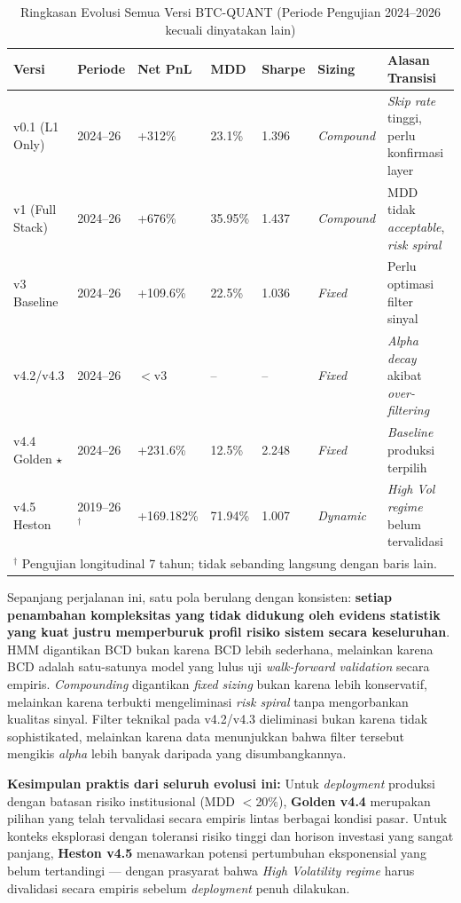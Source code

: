 \begin{table}[h!]
\centering
\caption{Ringkasan Evolusi Semua Versi BTC-QUANT (Periode Pengujian 2024--2026 kecuali dinyatakan lain)}
\label{table:evolution_all}
\begin{tabular}{@{}llllllp{3.2cm}@{}}
\toprule
\textbf{Versi} & \textbf{Periode} & \textbf{Net PnL} & \textbf{MDD} & \textbf{Sharpe} & \textbf{Sizing} & \textbf{Alasan Transisi} \\ \midrule
v0.1 (L1 Only)  & 2024--26 & +312\%   & 23.1\%  & 1.396 & \textit{Compound} & \textit{Skip rate} tinggi, perlu konfirmasi layer \\
v1 (Full Stack) & 2024--26 & +676\%   & 35.95\% & 1.437 & \textit{Compound} & MDD tidak \textit{acceptable}, \textit{risk spiral} \\
v3 Baseline     & 2024--26 & +109.6\% & 22.5\%  & 1.036 & \textit{Fixed}    & Perlu optimasi filter sinyal \\
v4.2/v4.3       & 2024--26 & $<$v3    & --      & --    & \textit{Fixed}    & \textit{Alpha decay} akibat \textit{over-filtering} \\
v4.4 Golden $\star$ & 2024--26 & +231.6\% & 12.5\% & 2.248 & \textit{Fixed} & \textit{Baseline} produksi terpilih \\
v4.5 Heston     & 2019--26$^\dagger$ & +169.182\% & 71.94\% & 1.007 & \textit{Dynamic} & \textit{High Vol regime} belum tervalidasi \\
\bottomrule
\multicolumn{7}{l}{\small $^\dagger$ Pengujian longitudinal 7 tahun; tidak sebanding langsung dengan baris lain.}
\end{tabular}
\end{table}

Sepanjang perjalanan ini, satu pola berulang dengan konsisten: \textbf{setiap penambahan kompleksitas yang tidak didukung oleh evidens statistik yang kuat justru memperburuk profil risiko sistem secara keseluruhan}. HMM digantikan BCD bukan karena BCD lebih sederhana, melainkan karena BCD adalah satu-satunya model yang lulus uji \textit{walk-forward validation} secara empiris. \textit{Compounding} digantikan \textit{fixed sizing} bukan karena lebih konservatif, melainkan karena terbukti mengeliminasi \textit{risk spiral} tanpa mengorbankan kualitas sinyal. Filter teknikal pada v4.2/v4.3 dieliminasi bukan karena tidak sophistikated, melainkan karena data menunjukkan bahwa filter tersebut mengikis \textit{alpha} lebih banyak daripada yang disumbangkannya.

\textbf{Kesimpulan praktis dari seluruh evolusi ini:} Untuk \textit{deployment} produksi dengan batasan risiko institusional (MDD $<$20\%), \textbf{Golden v4.4} merupakan pilihan yang telah tervalidasi secara empiris lintas berbagai kondisi pasar. Untuk konteks eksplorasi dengan toleransi risiko tinggi dan horison investasi yang sangat panjang, \textbf{Heston v4.5} menawarkan potensi pertumbuhan eksponensial yang belum tertandingi --- dengan prasyarat bahwa \textit{High Volatility regime} harus divalidasi secara empiris sebelum \textit{deployment} penuh dilakukan.
